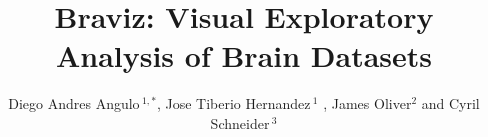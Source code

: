 \documentclass[utf8,paper]{frontiersSCNS} %
\def\firstAuthorLast{Diego Angulo {et~al.}} %
\def\Authors{Diego Andres Angulo\,$^{1,*}$, Jose Tiberio Hernandez\,$^{1}$ , James Oliver$^{2}$ and Cyril Schneider\,$^{3}$}
\begin{document}
\onecolumn
{}

\title[Braviz]{Braviz: Visual Exploratory Analysis of Brain Datasets} 

\author[\firstAuthorLast ]{\Authors} %
\address{} %
\correspondance{} %

\extraAuth{}%

\maketitle

\end{document}
